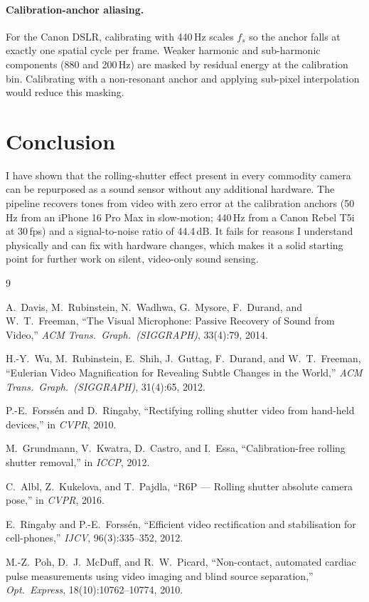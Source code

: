\documentclass[10pt,twocolumn,letterpaper]{article}
\begin{document}
\paragraph{Calibration-anchor aliasing.}
For the Canon DSLR, calibrating with 440\,Hz scales $f_s$ so the anchor falls at exactly one spatial cycle per frame. Weaker harmonic and sub-harmonic components (880 and 200\,Hz) are masked by residual energy at the calibration bin. Calibrating with a non-resonant anchor and applying sub-pixel interpolation would reduce this masking.

\section{Conclusion}
I have shown that the rolling-shutter effect present in every commodity camera can be repurposed as a sound sensor without any additional hardware. The pipeline recovers tones from video with zero error at the calibration anchors (50\,Hz from an iPhone 16 Pro Max in slow-motion; 440\,Hz from a Canon Rebel T5i at 30\,fps) and a signal-to-noise ratio of 44.4\,dB. It fails for reasons I understand physically and can fix with hardware changes, which makes it a solid starting point for further work on silent, video-only sound sensing.

{\small
\begin{thebibliography}{9}

A.~Davis, M.~Rubinstein, N.~Wadhwa, G.~Mysore, F.~Durand, and W.~T.~Freeman,
``The Visual Microphone: Passive Recovery of Sound from Video,''
\textit{ACM Trans.\ Graph.\ (SIGGRAPH)}, 33(4):79, 2014.

H.-Y.~Wu, M.~Rubinstein, E.~Shih, J.~Guttag, F.~Durand, and W.~T.~Freeman,
``Eulerian Video Magnification for Revealing Subtle Changes in the World,''
\textit{ACM Trans.\ Graph.\ (SIGGRAPH)}, 31(4):65, 2012.

P.-E.~Forss\'{e}n and D.~Ringaby,
``Rectifying rolling shutter video from hand-held devices,''
in \textit{CVPR}, 2010.

M.~Grundmann, V.~Kwatra, D.~Castro, and I.~Essa,
``Calibration-free rolling shutter removal,''
in \textit{ICCP}, 2012.

C.~Albl, Z.~Kukelova, and T.~Pajdla,
``R6P --- Rolling shutter absolute camera pose,''
in \textit{CVPR}, 2016.

E.~Ringaby and P.-E.~Forss\'{e}n,
``Efficient video rectification and stabilisation for cell-phones,''
\textit{IJCV}, 96(3):335--352, 2012.

M.-Z.~Poh, D.~J.~McDuff, and R.~W.~Picard,
``Non-contact, automated cardiac pulse measurements using video imaging and
blind source separation,''
\textit{Opt.\ Express}, 18(10):10762--10774, 2010.

\end{thebibliography}
}
\end{document}
